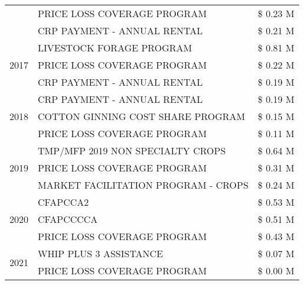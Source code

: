 \begin{tabular}{llr}
 & PRICE LOSS COVERAGE PROGRAM                   & \$ 0.23 M \\
 & CRP PAYMENT - ANNUAL RENTAL                   & \$ 0.21 M \\
\cline{1-3}
\multirow[t]{3}{*}{2017} & LIVESTOCK FORAGE PROGRAM & \$ 0.81 M \\
 & PRICE LOSS COVERAGE PROGRAM & \$ 0.22 M \\
 & CRP PAYMENT - ANNUAL RENTAL & \$ 0.19 M \\
\cline{1-3}
\multirow[t]{3}{*}{2018} & CRP PAYMENT - ANNUAL RENTAL & \$ 0.19 M \\
 & COTTON GINNING COST SHARE PROGRAM & \$ 0.15 M \\
 & PRICE LOSS COVERAGE PROGRAM & \$ 0.11 M \\
\cline{1-3}
\multirow[t]{3}{*}{2019} & TMP/MFP 2019 NON SPECIALTY CROPS & \$ 0.64 M \\
 & PRICE LOSS COVERAGE PROGRAM & \$ 0.31 M \\
 & MARKET FACILITATION PROGRAM - CROPS & \$ 0.24 M \\
\cline{1-3}
\multirow[t]{3}{*}{2020} & CFAPCCA2 & \$ 0.53 M \\
 & CFAPCCCCA & \$ 0.51 M \\
 & PRICE LOSS COVERAGE PROGRAM & \$ 0.43 M \\
\cline{1-3}
\multirow[t]{2}{*}{2021} & WHIP PLUS 3 ASSISTANCE & \$ 0.07 M \\
 & PRICE LOSS COVERAGE PROGRAM & \$ 0.00 M \\
\cline{1-3}
\bottomrule
\end{tabular}
